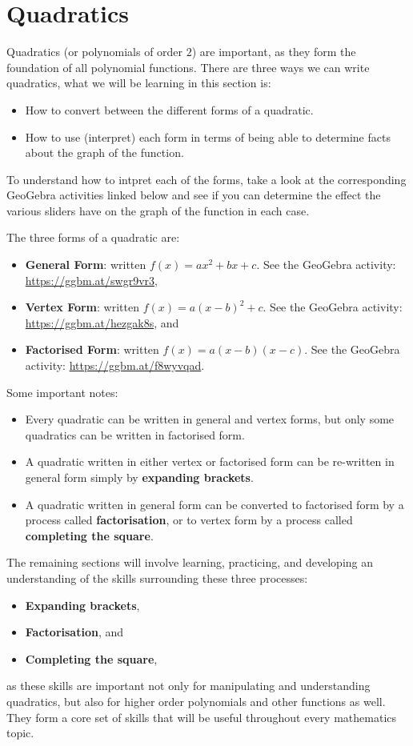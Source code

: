 \documentclass[12pt]{article}
\begin{document}
\section*{Quadratics}

Quadratics (or polynomials of order $2$) are important, as they form the foundation of all polynomial functions.
There are three ways we can write quadratics, what we will be learning in this section is:
\begin{itemize}
  \item How to convert between the different forms of a quadratic.
  \item How to use (interpret) each form in terms of being able to determine facts about the graph of the function.
\end{itemize}

To understand how to intpret each of the forms, take a look at the corresponding GeoGebra activities linked below and see if you can determine the effect the various sliders have on the graph of the function in each case.

The three forms of a quadratic are:
\begin{itemize}
  \item \textbf{General Form}: written $f(x) = ax^2 + bx + c$. See the GeoGebra activity: \url{https://ggbm.at/swgr9vr3}, 
  \item \textbf{Vertex Form}: written $f(x) = a(x - b)^2 + c$. See the GeoGebra activity: \url{https://ggbm.at/hezgak8s}, and
  \item \textbf{Factorised Form}: written $f(x) = a(x - b)(x - c)$. See the GeoGebra activity: \url{https://ggbm.at/f8wyvqad}.
\end{itemize}

Some important notes:
\begin{itemize}
  \item Every quadratic can be written in general and vertex forms, but only some quadratics can be written in factorised form.
  \item A quadratic written in either vertex or factorised form can be re-written in general form simply by \textbf{expanding brackets}.
  \item A quadratic written in general form can be converted to factorised form by a process called \textbf{factorisation}, or to vertex form by a process called \textbf{completing the square}.
\end{itemize}

The remaining sections will involve learning, practicing, and developing an understanding of the skills surrounding these three processes:
\begin{itemize}
  \item \textbf{Expanding brackets},
  \item \textbf{Factorisation}, and
  \item \textbf{Completing the square},
\end{itemize}
as these skills are important not only for manipulating and understanding quadratics, but also for higher order polynomials and other functions as well. They form a core set of skills that will be useful throughout every mathematics topic.
\end{document}
